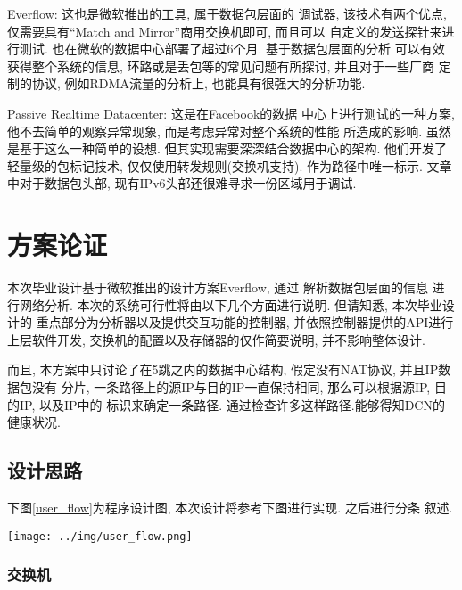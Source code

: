 {\begin{mdframed}[everyline=true]
Everflow:  这也是微软推出的工具,
属于数据包层面的 调试器, 该技术有两个优点, 仅需要具有``Match and
Mirror''商用交换机即可, 而且可以 自定义的发送探针来进行测试.
也在微软的数据中心部署了超过6个月. 基于数据包层面的分析
可以有效获得整个系统的信息, 环路或是丢包等的常见问题有所探讨,
并且对于一些厂商 定制的协议, 例如RDMA流量的分析上,
也能具有很强大的分析功能.

Passive Realtime Datacenter:  这是在Facebook的数据
中心上进行测试的一种方案, 他不去简单的观察异常现象,
而是考虑异常对整个系统的性能 所造成的影响. 虽然是基于这么一种简单的设想.
但其实现需要深深结合数据中心的架构. 他们开发了轻量级的包标记技术,
仅仅使用转发规则(交换机支持). 作为路径中唯一标示. 文章中对于数据包头部,
现有IPv6头部还很难寻求一份区域用于调试.



\section{方案论证}

本次毕业设计基于微软推出的设计方案Everflow,
通过 解析数据包层面的信息 进行网络分析.
本次的系统可行性将由以下几个方面进行说明. 但请知悉, 本次毕业设计的
重点部分为分析器以及提供交互功能的控制器,
并依照控制器提供的API进行上层软件开发,
交换机的配置以及存储器的仅作简要说明, 并不影响整体设计.

而且, 本方案中只讨论了在5跳之内的数据中心结构, 假定没有NAT协议, 并且IP数据包没有
分片, 一条路径上的源IP与目的IP一直保持相同, 那么可以根据源IP, 目的IP, 以及IP中的
标识来确定一条路径. 通过检查许多这样路径.能够得知DCN的健康状况.

\subsection{设计思路}

  下图\ref{user_flow}为程序设计图, 本次设计将参考下图进行实现. 之后进行分条
叙述.

\begin{center}
    \texttt{[image: ../img/user\_flow.png]}
    \label{user_flow}
\end{center}

\subsubsection{交换机}


\end{mdframed}}
